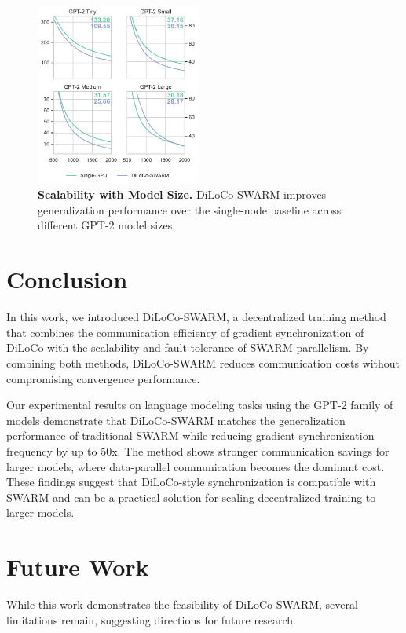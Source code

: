 \documentclass{article}
\begin{document}
\begin{figure}[ht]
  \centering
  \includegraphics[width=0.48\textwidth]{figures/experiment3.pdf}
  \caption{\textbf{Scalability with Model Size.} DiLoCo-SWARM improves
  generalization performance over the single-node baseline across different
  GPT-2 model sizes.}
  \label{fig:experiment3}
\end{figure}

\section{Conclusion}

In this work, we introduced DiLoCo-SWARM, a decentralized training method that combines the communication efficiency of gradient synchronization of DiLoCo with the scalability and fault-tolerance of SWARM parallelism. By combining both methods, DiLoCo-SWARM reduces communication costs without compromising convergence performance.

Our experimental results on language modeling tasks using the GPT-2 family of models demonstrate that DiLoCo-SWARM matches the generalization performance of traditional SWARM while reducing gradient synchronization frequency by up to 50x. The method shows stronger communication savings for larger models, where data-parallel communication becomes the dominant cost. These findings suggest that DiLoCo-style synchronization is compatible with SWARM and can be a practical solution for scaling decentralized training to larger models.

\section{Future Work}

While this work demonstrates the feasibility of DiLoCo-SWARM, several limitations remain, suggesting directions for future research.
\end{document}
